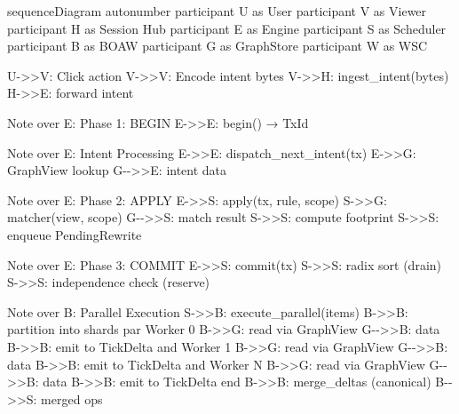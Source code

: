 \documentclass[
]{book}
\newenvironment{Shaded}{}{}
\newcommand{\NormalTok}[1]{#1}
\begin{document}
\begin{Shaded}
\begin{Highlighting}[]
\NormalTok{sequenceDiagram}
\NormalTok{    autonumber}
\NormalTok{    participant U as User}
\NormalTok{    participant V as Viewer}
\NormalTok{    participant H as Session Hub}
\NormalTok{    participant E as Engine}
\NormalTok{    participant S as Scheduler}
\NormalTok{    participant B as BOAW}
\NormalTok{    participant G as GraphStore}
\NormalTok{    participant W as WSC}

\NormalTok{    U{-}\textgreater{}\textgreater{}V: Click action}
\NormalTok{    V{-}\textgreater{}\textgreater{}V: Encode intent bytes}
\NormalTok{    V{-}\textgreater{}\textgreater{}H: ingest\_intent(bytes)}
\NormalTok{    H{-}\textgreater{}\textgreater{}E: forward intent}

\NormalTok{    Note over E: Phase 1: BEGIN}
\NormalTok{    E{-}\textgreater{}\textgreater{}E: begin() → TxId}

\NormalTok{    Note over E: Intent Processing}
\NormalTok{    E{-}\textgreater{}\textgreater{}E: dispatch\_next\_intent(tx)}
\NormalTok{    E{-}\textgreater{}\textgreater{}G: GraphView lookup}
\NormalTok{    G{-}{-}\textgreater{}\textgreater{}E: intent data}

\NormalTok{    Note over E: Phase 2: APPLY}
\NormalTok{    E{-}\textgreater{}\textgreater{}S: apply(tx, rule, scope)}
\NormalTok{    S{-}\textgreater{}\textgreater{}G: matcher(view, scope)}
\NormalTok{    G{-}{-}\textgreater{}\textgreater{}S: match result}
\NormalTok{    S{-}\textgreater{}\textgreater{}S: compute footprint}
\NormalTok{    S{-}\textgreater{}\textgreater{}S: enqueue PendingRewrite}

\NormalTok{    Note over E: Phase 3: COMMIT}
\NormalTok{    E{-}\textgreater{}\textgreater{}S: commit(tx)}
\NormalTok{    S{-}\textgreater{}\textgreater{}S: radix sort (drain)}
\NormalTok{    S{-}\textgreater{}\textgreater{}S: independence check (reserve)}

\NormalTok{    Note over B: Parallel Execution}
\NormalTok{    S{-}\textgreater{}\textgreater{}B: execute\_parallel(items)}
\NormalTok{    B{-}\textgreater{}\textgreater{}B: partition into shards}
\NormalTok{    par Worker 0}
\NormalTok{        B{-}\textgreater{}\textgreater{}G: read via GraphView}
\NormalTok{        G{-}{-}\textgreater{}\textgreater{}B: data}
\NormalTok{        B{-}\textgreater{}\textgreater{}B: emit to TickDelta}
\NormalTok{    and Worker 1}
\NormalTok{        B{-}\textgreater{}\textgreater{}G: read via GraphView}
\NormalTok{        G{-}{-}\textgreater{}\textgreater{}B: data}
\NormalTok{        B{-}\textgreater{}\textgreater{}B: emit to TickDelta}
\NormalTok{    and Worker N}
\NormalTok{        B{-}\textgreater{}\textgreater{}G: read via GraphView}
\NormalTok{        G{-}{-}\textgreater{}\textgreater{}B: data}
\NormalTok{        B{-}\textgreater{}\textgreater{}B: emit to TickDelta}
\NormalTok{    end}
\NormalTok{    B{-}\textgreater{}\textgreater{}B: merge\_deltas (canonical)}
\NormalTok{    B{-}{-}\textgreater{}\textgreater{}S: merged ops}


\end{Highlighting}
\end{Shaded}
\end{document}
